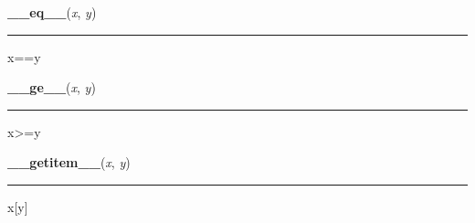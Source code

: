     \label{resource:struct_rusage:__eq__}

    \vspace{0.5ex}

\hspace{.8\funcindent}\begin{boxedminipage}{\funcwidth}

    \raggedright \textbf{\_\_eq\_\_}(\textit{x}, \textit{y})

    \vspace{-1.5ex}

    \rule{\textwidth}{0.5\fboxrule}
\setlength{\parskip}{2ex}
    x==y

\setlength{\parskip}{1ex}
    \end{boxedminipage}

    \label{resource:struct_rusage:__ge__}

    \vspace{0.5ex}

\hspace{.8\funcindent}\begin{boxedminipage}{\funcwidth}

    \raggedright \textbf{\_\_ge\_\_}(\textit{x}, \textit{y})

    \vspace{-1.5ex}

    \rule{\textwidth}{0.5\fboxrule}
\setlength{\parskip}{2ex}
    x{\textgreater}=y

\setlength{\parskip}{1ex}
    \end{boxedminipage}

    \label{resource:struct_rusage:__getitem__}

    \vspace{0.5ex}

\hspace{.8\funcindent}\begin{boxedminipage}{\funcwidth}

    \raggedright \textbf{\_\_getitem\_\_}(\textit{x}, \textit{y})

    \vspace{-1.5ex}

    \rule{\textwidth}{0.5\fboxrule}
\setlength{\parskip}{2ex}
    x[y]

\setlength{\parskip}{1ex}
    \end{boxedminipage}

